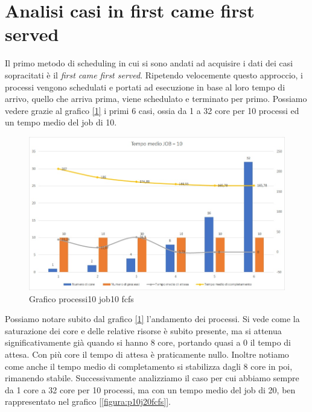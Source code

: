\documentclass[Lau, oneside]{sapthesis}%
\begin{document}
\section{Analisi casi in first came first served}
\label{sec:analisiFCFS}
Il primo metodo di scheduling in cui si sono andati ad acquisire i dati dei casi sopracitati è il \textit{first came first served}.
Ripetendo velocemente questo approccio, i processi vengono schedulati e portati ad esecuzione in base al loro tempo di arrivo, quello che arriva prima, viene schedulato e terminato per primo.
Possiamo vedere grazie al grafico
\hyperref[figura:p10j10fcfs]{[\ref*{figura:p10j10fcfs}]} i primi 6 casi, ossia da 1 a 32 core per 10 processi ed un tempo medio del job di 10.
\begin{figure}[ht!]
  \centering
  \includegraphics[width=1\textwidth]{Grafico processi10 job10 fcfs.jpg}
  \caption{Grafico processi10 job10 fcfs}
  \label{figura:p10j10fcfs}
\end{figure}
Possiamo notare subito dal grafico \hyperref[figura:p10j10fcfs]{[\ref*{figura:p10j10fcfs}]} l'andamento dei processi. 
Si vede come la saturazione dei core e delle relative risorse è subito presente, ma si attenua significativamente già quando si hanno 8 core, portando quasi a 0 il tempo di attesa.
Con più core il tempo di attesa è praticamente nullo.
Inoltre notiamo come anche il tempo medio di completamento si stabilizza dagli 8 core in poi, rimanendo stabile.
Successivamente analizziamo il caso per cui abbiamo sempre da 1 core a 32 core per 10 processi, ma con un tempo medio del job di 20, ben rappresentato nel grafico \hyperref[figura:p10j20fcfs]{[\ref*{figura:p10j20fcfs}]}.
\end{document}
